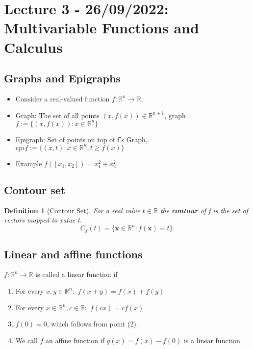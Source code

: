 \documentclass[11pt]{article}
\newtheorem{definition}[theorem]{Definition}
\begin{document}
\section{Lecture 3 - 26/09/2022: Multivariable Functions and Calculus} %

\subsection*{Graphs and Epigraphs}
\begin{itemize}
    \item Consider a real-valued function $f:\mathbb{R}^n \to \mathbb{R}$, 
    \item Graph: The set of all points $(x, f(x)) \in \mathbb{R}^{n+1}$, graph $f:=\{(x,f(x)):x\in\mathbb{R}^n \}$
    \item Epigraph: Set of points on top of f's Graph, $epi f := \{(x,t):x\in\mathbb{R}^n, t \geq f(x)\}$
    \item Example $f([x_1,x_2]) = x_1^2 +x_2^2$  
\end{itemize}


\subsection*{Contour set}
\begin{definition}[Contour Set]
    For a real value $t\in \mathbb{R}$ the \textbf{contour} of f is the set of vectors mapped to value t.
    \[
    C_f(t) = \{ \mathbf{x} \in \mathbb{R}^n: f(\mathbf{x}) = t \}
    .\]  
\end{definition}

 \subsection*{Linear and affine functions}
 $f: \mathbb{R}^n \to \mathbb{R}$ is called a linear function if 
 \begin{enumerate}
    \item For every $x,y \in \mathbb{R}^n: $ $f(x+y) = f(x) + f(y)$ 
    \item For every $x \in \mathbb{R}^n, c\in \mathbb{R}: $ $f(cx) = c f(x)$  
    \item $f(0) = 0$, which follows from point (2).
    \item We call $f$ an affine function if $g(x) = f(x) - f(0)$ is a linear function   
 \end{enumerate}
  
\end{document}
